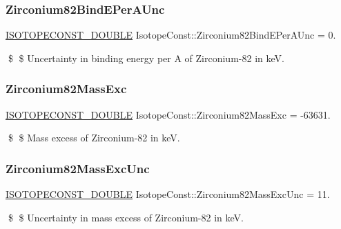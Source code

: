 \subsubsection{\texorpdfstring{Zirconium82\+Bind\+E\+Per\+A\+Unc}{Zirconium82BindEPerAUnc}}
{\footnotesize\ttfamily \mbox{\hyperlink{group___isotope_const-_macros_ga8f45a7272ce02c0b4c65c44636ed719a}{I\+S\+O\+T\+O\+P\+E\+C\+O\+N\+S\+T\+\_\+\+D\+O\+U\+B\+LE}} Isotope\+Const\+::\+Zirconium82\+Bind\+E\+Per\+A\+Unc = 0.}

\$ \$ Uncertainty in binding energy per A of Zirconium-\/82 in keV. \mbox{\label{group___isotope_const-_zirconium-_zr82_ga77598962072a93e2fdcb25698a541f0f}} 
\subsubsection{\texorpdfstring{Zirconium82\+Mass\+Exc}{Zirconium82MassExc}}
{\footnotesize\ttfamily \mbox{\hyperlink{group___isotope_const-_macros_ga8f45a7272ce02c0b4c65c44636ed719a}{I\+S\+O\+T\+O\+P\+E\+C\+O\+N\+S\+T\+\_\+\+D\+O\+U\+B\+LE}} Isotope\+Const\+::\+Zirconium82\+Mass\+Exc = -\/63631.}

\$ \$ Mass excess of Zirconium-\/82 in keV. \mbox{\label{group___isotope_const-_zirconium-_zr82_gac3fc1b6f99761dcc73e9960136f3dd8d}} 
\subsubsection{\texorpdfstring{Zirconium82\+Mass\+Exc\+Unc}{Zirconium82MassExcUnc}}
{\footnotesize\ttfamily \mbox{\hyperlink{group___isotope_const-_macros_ga8f45a7272ce02c0b4c65c44636ed719a}{I\+S\+O\+T\+O\+P\+E\+C\+O\+N\+S\+T\+\_\+\+D\+O\+U\+B\+LE}} Isotope\+Const\+::\+Zirconium82\+Mass\+Exc\+Unc = 11.}

\$ \$ Uncertainty in mass excess of Zirconium-\/82 in keV. \mbox{\label{group___isotope_const-_zirconium-_zr82_ga2c4283954ce1032815b5a64a47ed72a5}} 
